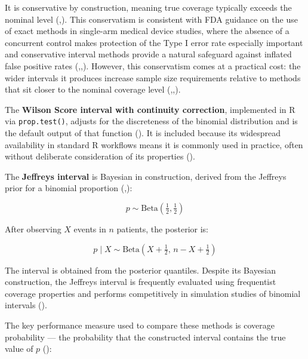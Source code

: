 \documentclass{article}
\begin{document}
It is conservative by construction, meaning true coverage typically
exceeds the nominal level
(,).
This conservatism is consistent with FDA guidance on the use of exact
methods in single-arm medical device studies, where the absence of a
concurrent control makes protection of the Type I error rate especially
important and conservative interval methods provide a natural safeguard
against inflated false positive rates
(,,).
However, this conservatism comes at a practical cost: the wider
intervals it produces increase sample size requirements relative to
methods that sit closer to the nominal coverage level
(,,).

The \textbf{Wilson Score interval with continuity correction},
implemented in R via \texttt{prop.test()}, adjusts for the discreteness
of the binomial distribution and is the default output of that function
(). It is included because
its widespread availability in standard R workflows means it is commonly
used in practice, often without deliberate consideration of its
properties ().

The \textbf{Jeffreys interval} is Bayesian in construction, derived from
the Jeffreys prior for a binomial proportion
(,):

\[p \sim \text{Beta}\!\left(\tfrac{1}{2}, \tfrac{1}{2}\right)\]

After observing \(X\) events in \(n\) patients, the posterior is:

\[p \mid X \sim \text{Beta}\!\left(X + \tfrac{1}{2},\, n - X + \tfrac{1}{2}\right)\]

The interval is obtained from the posterior quantiles. Despite its
Bayesian construction, the Jeffreys interval is frequently evaluated
using frequentist coverage properties and performs competitively in
simulation studies of binomial intervals
().

The key performance measure used to compare these methods is coverage
probability --- the probability that the constructed interval contains
the true value of \(p\) ():
\end{document}
